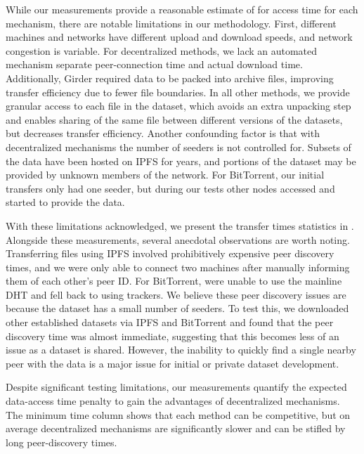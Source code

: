 \documentclass[10pt,twocolumn,letterpaper]{article}
\begin{document}
While our measurements provide a reasonable estimate of for access time for each mechanism, there are
  notable limitations in our methodology.
First, different machines and networks have different upload and download speeds, and network congestion is
  variable.
For decentralized methods, we lack an automated mechanism separate peer-connection time and actual download
  time.
Additionally, Girder required data to be packed into archive files, improving transfer efficiency due to
  fewer file boundaries.
In all other methods, we provide granular access to each file in the dataset, which avoids an extra
  unpacking step and enables sharing of the same file between different versions of the datasets, but
  decreases transfer efficiency.
Another confounding factor is that with decentralized mechanisms the number of seeders is not controlled
  for.
Subsets of the data have been hosted on IPFS for years, and portions of the dataset may be provided by
  unknown members of the network.
For BitTorrent, our initial transfers only had one seeder, but during our tests other nodes accessed and
  started to provide the data.

With these limitations acknowledged, we present the transfer times statistics in .
Alongside these measurements, several anecdotal observations are worth noting.
Transferring files using IPFS involved prohibitively expensive peer discovery times, and we were only able
  to connect two machines after manually informing them of each other's peer ID.
For BitTorrent, were unable to use the mainline DHT and fell back to using trackers.
We believe these peer discovery issues are because the dataset has a small number of seeders.
To test this, we downloaded other established datasets via IPFS and BitTorrent and found that the peer
  discovery time was almost immediate, suggesting that this becomes less of an issue as a dataset is shared.
However, the inability to quickly find a single nearby peer with the data is a major issue for initial or
  private dataset development.

Despite significant testing limitations, our measurements quantify the expected data-access time penalty to
  gain the advantages of decentralized mechanisms.
The minimum time column shows that each method can be competitive, but on average decentralized
  mechanisms are significantly slower and can be stifled by long peer-discovery times.
  

\end{document}
